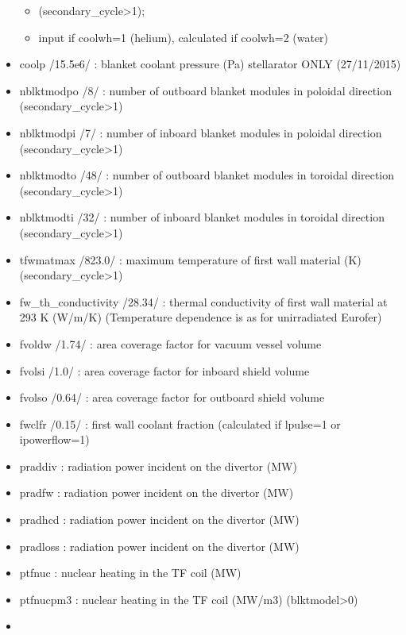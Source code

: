 \documentclass[]{article}
\begin{document}
\begin{itemize}
  \begin{itemize}
  \itemsep1pt\parskip0pt
  \item
    (secondary\_cycle\textgreater{}1);
  \item
    input if coolwh=1 (helium), calculated if coolwh=2 (water)
  \end{itemize}
\item
  coolp /15.5e6/ : blanket coolant pressure (Pa) stellarator ONLY
  (27/11/2015)
\item
  nblktmodpo /8/ : number of outboard blanket modules in poloidal
  direction (secondary\_cycle\textgreater{}1)
\item
  nblktmodpi /7/ : number of inboard blanket modules in poloidal
  direction (secondary\_cycle\textgreater{}1)
\item
  nblktmodto /48/ : number of outboard blanket modules in toroidal
  direction (secondary\_cycle\textgreater{}1)
\item
  nblktmodti /32/ : number of inboard blanket modules in toroidal
  direction (secondary\_cycle\textgreater{}1)
\item
  tfwmatmax /823.0/ : maximum temperature of first wall material (K)
  (secondary\_cycle\textgreater{}1)
\item
  fw\_th\_conductivity /28.34/ : thermal conductivity of first wall
  material at 293 K (W/m/K) (Temperature dependence is as for
  unirradiated Eurofer)
\item
  fvoldw /1.74/ : area coverage factor for vacuum vessel volume
\item
  fvolsi /1.0/ : area coverage factor for inboard shield volume
\item
  fvolso /0.64/ : area coverage factor for outboard shield volume
\item
  fwclfr /0.15/ : first wall coolant fraction (calculated if lpulse=1 or
  ipowerflow=1)
\item
  praddiv : radiation power incident on the divertor (MW)
\item
  pradfw : radiation power incident on the divertor (MW)
\item
  pradhcd : radiation power incident on the divertor (MW)
\item
  pradloss : radiation power incident on the divertor (MW)
\item
  ptfnuc : nuclear heating in the TF coil (MW)
\item
  ptfnucpm3 : nuclear heating in the TF coil (MW/m3)
  (blktmodel\textgreater{}0)
\item

\end{itemize}
\end{document}
